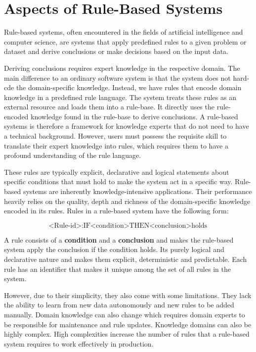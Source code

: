 \chapter{Aspects of Rule-Based Systems}\label{ch:aspects-of-rule-based-systems}

Rule-based systems, often encountered in the fields of artificial intelligence and computer science,
are systems that apply predefined rules to a given problem or dataset
and derive conclusions or make decisions based on the input data\cite{grosan2011rule}.

Deriving conclusions requires expert knowledge in the respective domain.
The main difference to an ordinary software system is that the system does not hard-cde the domain-specific knowledge.
Instead, we have rules that encode domain knowledge in a predefined rule language.
The system treats these rules as an external resource and loads them into a rule-base.
It directly uses the rule-encoded knowledge found in the rule-base to derive conclusions.
A rule-based systems is therefore a framework for knowledge experts that do not need to have a technical background.
However, users must possess the requisite skill to translate their expert knowledge into rules,
which requires them to have a profound understanding of the rule language.


These rules are typically explicit,
declarative and logical statements about specific conditions that must hold to make the system act in a specific way.
Rule-based systems are inherently knowledge-intensive applications\cite{hayes1985rule}.
Their performance heavily relies on the quality,
depth and richness of the domain-specific knowledge encoded in its rules.
Rules in a rule-based system have the following form:

\[
    \text{<Rule-id>}: \text{IF} \text{<condition>} \text{THEN} \text{<conclusion>} \text{holds}
\]


A rule consists of a \textbf{condition} and a \textbf{conclusion}
and makes the rule-based system apply the conclusion if the condition holds.
Its purely logical and declarative nature and makes them explicit, deterministic and predictable.
Each rule has an identifier that makes it unique among the set of all rules in the system.

However, due to their simplicity, they also come with some limitations.
They lack the ability to learn from new data autonomously and new rules to be added manually.
Domain knowledge can also change which requires domain experts to be responsible for maintenance and rule updates.
Knowledge domains can also be highly complex.
High complexities increase the number of rules that a rule-based system requires to work effectively in production.



